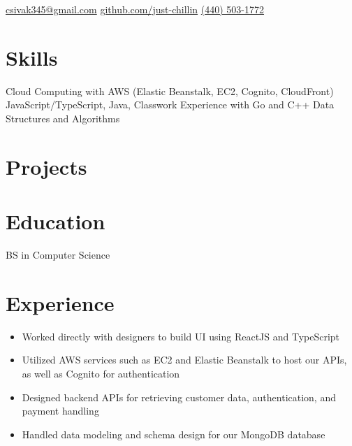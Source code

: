 \documentclass{cv}
\begin{document}
	
	\contact
		{\faEnvelopeSquare\space\href{mailto:csivak345@gmail.com}{csivak345@gmail.com}}
		{\faGithub\space\url{github.com/just-chillin}}
		{\faPhone\space\href{tel:14405031772}{(440) 503-1772}}
	
	
	
	\section{Skills}
	Cloud Computing with AWS (Elastic Beanstalk, EC2, Cognito, CloudFront)\newline
	JavaScript/TypeScript, Java, Classwork Experience with Go and C++\newline
	Data Structures and Algorithms
	
	\section{Projects}
	

	\section{Education}
	BS in Computer Science

	\section{Experience}
	\begin{itemize}
		\item Worked directly with designers to build UI using ReactJS and TypeScript
		\item Utilized AWS services such as EC2 and Elastic Beanstalk to host our APIs, as well as Cognito for authentication
		\item Designed backend APIs for retrieving customer data, authentication, and payment handling
		\item Handled data modeling and schema design for our MongoDB database
	\end{itemize}
\end{document}
